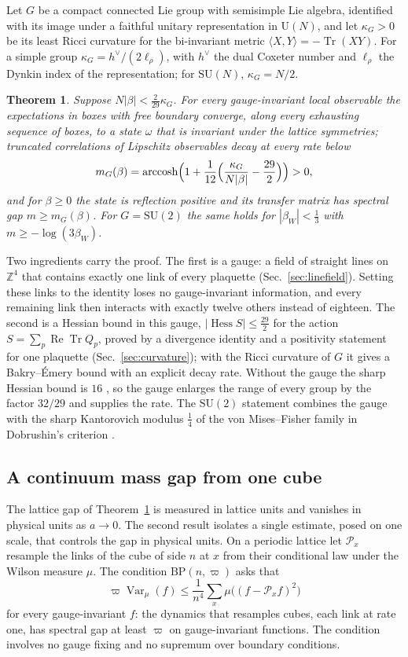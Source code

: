 \documentclass[11pt]{amsart}
\newtheorem{mainthm}{Theorem}
\theoremstyle{definition}
\theoremstyle{remark}
\numberwithin{equation}{section}
\newcommand{\Z}{\mathbb{Z}}
\newcommand{\SU}{\mathrm{SU}}
\newcommand{\U}{\mathrm{U}}
\newcommand{\Tr}{\operatorname{Tr}}
\newcommand{\ReTr}{\operatorname{Re}\operatorname{Tr}}
\newcommand{\Hess}{\operatorname{Hess}}
\newcommand{\Var}{\operatorname{Var}}
\newcommand{\ip}[2]{\langle #1,#2\rangle}
\newcommand{\BP}{\mathrm{BP}}
\begin{document}
Let $G$ be a compact connected Lie group with semisimple Lie algebra,
identified with its image under a faithful unitary representation in $\U(N)$,
and let $\kappa_G>0$ be its least Ricci curvature for the bi-invariant metric
$\ip XY=-\Tr(XY)$. For a simple group $\kappa_G=h^\vee/(2\ell_\rho)$, with $h^\vee$
the dual Coxeter number and $\ell_\rho$ the Dynkin index of the representation;
for $\SU(N)$, $\kappa_G=N/2$.

\begin{mainthm}\label{thm:A}
Suppose $N|\beta|<\frac2{29}\kappa_G$. For every gauge-invariant local
observable the expectations in boxes with free boundary converge, along every
exhausting sequence of boxes, to a state $\omega$ that is invariant under the
lattice symmetries; truncated correlations of Lipschitz observables decay at
every rate below
\[
m_G(\beta)=\operatorname{arccosh}\Bigl(1+\frac1{12}\Bigl(\frac{\kappa_G}{N|\beta|}
-\frac{29}2\Bigr)\Bigr)>0 ,
\]
and for $\beta\ge0$ the state is reflection positive and its transfer matrix
has spectral gap $m\ge m_G(\beta)$. For $G=\SU(2)$ the same holds for
$|\beta_W|<\frac13$ with $m\ge-\log(3\beta_W)$.
\end{mainthm}

Two ingredients carry the proof. The first is a gauge: a field of straight
lines on $\Z^4$ that contains exactly one link of every plaquette
(Sec.~\ref{sec:linefield}). Setting these links to the identity loses no
gauge-invariant information, and every remaining link then interacts with
exactly twelve others instead of eighteen. The second is a Hessian bound in
this gauge, $|\Hess S|\le\frac{29}2$ for the action $S=\sum_p\ReTr Q_p$, proved
by a divergence identity and a positivity statement for one plaquette
(Sec.~\ref{sec:curvature}); with the Ricci curvature of $G$ it gives a
Bakry--\'Emery bound \cite{BE85,BGL14} with an explicit decay rate. Without
the gauge the sharp Hessian bound is $16$ \cite{BB26a}, so the gauge enlarges
the range of every group by the factor $32/29$ and supplies the rate. The
$\SU(2)$ statement combines the gauge with the sharp Kantorovich modulus
$\frac14$ of the von Mises--Fisher family \cite{BB26a} in Dobrushin's
criterion \cite{Dob68,Dob70}.

\subsection{A continuum mass gap from one cube}

The lattice gap of Theorem~\ref{thm:A} is measured in lattice units and
vanishes in physical units as $a\to0$. The second result isolates a single
estimate, posed on one scale, that controls the gap in physical units. On a
periodic lattice let $\mathcal P_x$ resample the links of the cube of side $n$
at $x$ from their conditional law under the Wilson measure $\mu$. The
condition $\BP(n,\varpi)$ asks that
\[
\varpi\Var_\mu(f)\le\frac1{n^4}\sum_x\mu\bigl((f-\mathcal P_xf)^2\bigr)
\]
for every gauge-invariant $f$: the dynamics that resamples cubes, each link
at rate one, has spectral gap at least $\varpi$ on gauge-invariant functions.
The condition involves no gauge fixing and no supremum over boundary
conditions.
\end{document}
